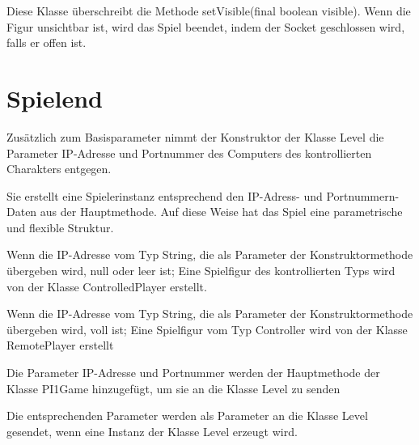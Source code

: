 \documentclass{pi1}
\begin{document}


Diese Klasse überschreibt die Methode setVisible(final boolean visible). 
Wenn die Figur unsichtbar ist, wird das Spiel beendet, indem der Socket geschlossen wird, falls er offen ist.



\section{Spielend}

Zusätzlich zum Basisparameter nimmt der Konstruktor der Klasse Level die Parameter IP-Adresse und Portnummer des Computers des kontrollierten Charakters entgegen.



Sie erstellt eine Spielerinstanz entsprechend den IP-Adress- und Portnummern-Daten aus der Hauptmethode. Auf diese Weise hat das Spiel eine parametrische und flexible Struktur.

Wenn die IP-Adresse vom Typ String, die als Parameter der Konstruktormethode übergeben wird, null oder leer ist;
Eine Spielfigur des kontrollierten Typs wird von der Klasse ControlledPlayer erstellt.

Wenn die IP-Adresse vom Typ String, die als Parameter der Konstruktormethode übergeben wird, voll ist;
Eine Spielfigur vom Typ Controller wird von der Klasse RemotePlayer erstellt



Die Parameter IP-Adresse und Portnummer werden der Hauptmethode der Klasse PI1Game hinzugefügt, um sie an die Klasse Level zu senden



Die entsprechenden Parameter werden als Parameter an die Klasse Level gesendet, wenn eine Instanz der Klasse Level erzeugt wird.


\end{document}
